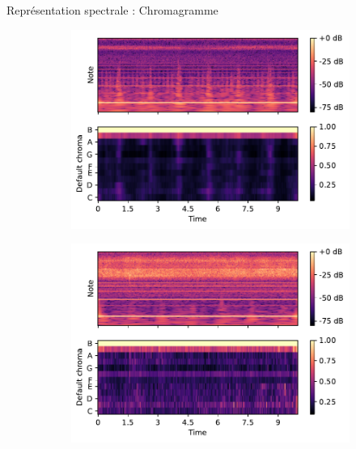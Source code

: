 \documentclass[compress,xcolor=table]{beamer}
\begin{document}



\begin{frame}{Représentation spectrale : Chromagramme}

    \begin{figure}[ht]
        \centering
        \begin{subfigure}[b]{0.45\textwidth}
            \centering
            \includegraphics[width=\textwidth]{../images/audio/birds.chromagram.birdvox.pdf}
            \label{fig:birds.chromagram.birdvox}
        \end{subfigure}
        \hfill
        \begin{subfigure}[b]{0.45\textwidth}
            \centering
            \includegraphics[width=\textwidth]{../images/audio/nobirds.chromagram.birdvox.pdf}
            \label{fig:nobirds.chromagram.birdvox}
        \end{subfigure}


\end{figure}
\end{frame}
\end{document}
